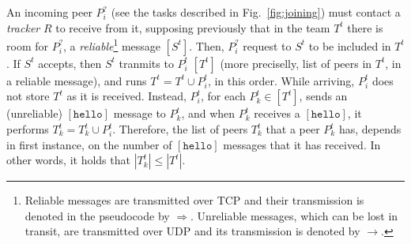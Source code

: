 
\label{sec:peer_joining}
\begin{figure*}
  \caption{Tasks involved in a peer joining.\label{fig:joining}}
\end{figure*}
An incoming peer $P^?_i$ (see the tasks described in
Fig.~\ref{fig:joining}) must contact a \emph{tracker} $R$ to receive
from it, supposing previously that in the team $T^t$ there is room for
$P^?_i$, a \emph{reliable}\footnote{Reliable messages are transmitted
  over TCP and their transmission is denoted in the pseudocode by
  $\Rightarrow$. Unreliable messages, which can be lost in transit,
  are transmitted over UDP and its transmission is denoted by
  $\rightarrow$.} message $[S^t]$. Then, $P^?_i$ request to $S^t$ to
be included in $T^t$. If $S^t$ accepts, then $S^t$ tranmits to $P^t_i$
$[T^t]$ (more preciselly, list of peers in $T^t$, in a reliable
message), and runs $T^t = T^t \cup P^t_i$, in this order.
While arriving, $P^t_i$ does not store $T^t$ as it is
received. Instead, $P^t_i$, for each $P^t_k\in [T^t]$, sends an
(unreliable) $[\mathtt{hello}]$ message to $P^t_k$, and when $P^t_k$
receives a $[\mathtt{hello}]$, it performs $T^t_k = T^t_k \cup
P^t_i$. Therefore, the list of peers $T^t_k$ that a peer $P^t_k$ has,
depends in first instance, on the number of $[\mathtt{hello}]$
messages that it has received. In other words, it holds that $|T^t_k| \leq |T^t|$.

